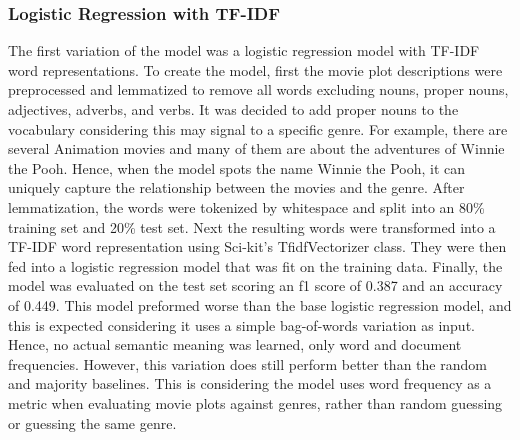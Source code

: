 \subsubsection{Logistic Regression with TF-IDF}
The first variation of the model was a logistic regression model with TF-IDF word representations. 
To create the model, first the movie plot descriptions were preprocessed and lemmatized to remove all words excluding nouns, proper nouns, adjectives, adverbs, and verbs. 
It was decided to add proper nouns to the vocabulary considering this may signal to a specific genre. 
For example, there are several Animation movies and many of them are about the adventures of Winnie the Pooh. 
Hence, when the model spots the name Winnie the Pooh, it can uniquely capture the relationship between the movies and the genre. 
After lemmatization, the words were tokenized by whitespace and split into an 80\% training set and 20\% test set. 
Next the resulting words were transformed into a TF-IDF word representation using Sci-kit’s TfidfVectorizer class. 
They were then fed into a logistic regression model that was fit on the training data. 
Finally, the model was evaluated on the test set scoring an f1 score of 0.387 and an accuracy of 0.449. 
This model preformed worse than the base logistic regression model, and this is expected considering it uses a simple bag-of-words variation as input. 
Hence, no actual semantic meaning was learned, only word and document frequencies. However, this variation does still perform better than the random and majority baselines. 
This is considering the model uses word frequency as a metric when evaluating movie plots against genres, rather than random guessing or guessing the same genre.

